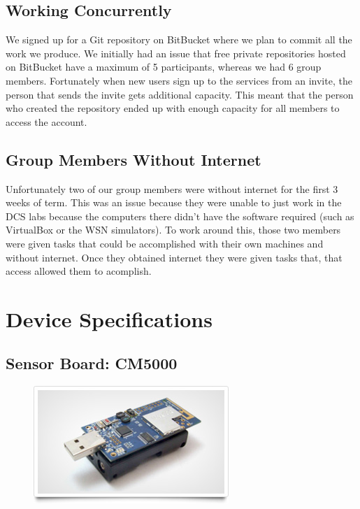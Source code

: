 \documentclass[a4paper]{article}
\begin{document}
\subsection{Working Concurrently}

We signed up for a Git repository on BitBucket \cite{?} where we plan to commit all the work we produce. We initially had an issue that free private repositories hosted on BitBucket have a maximum of 5 participants, whereas we had 6 group members. Fortunately when new users sign up to the services from an invite, the person that sends the invite gets additional capacity. This meant that the person who created the repository ended up with enough capacity for all members to access the account.

\subsection{Group Members Without Internet}
Unfortunately two of our group members were without internet for the first 3 weeks of term. This was an issue because they were unable to just work in the DCS labs because the computers there didn't have the software required (such as VirtualBox or the WSN simulators). To work around this, those two members were given tasks that could be accomplished with their own machines and without internet. Once they obtained internet they were given tasks that, that access allowed them to acomplish.

\clearpage

\appendixpage
\addappheadtotoc
\appendix

\section{Device Specifications}

\subsection{Sensor Board: CM5000}

\begin{figure}[H]
\centering
\includegraphics[scale=0.5]{Images/CM5000}
\end{figure}
\end{document}
